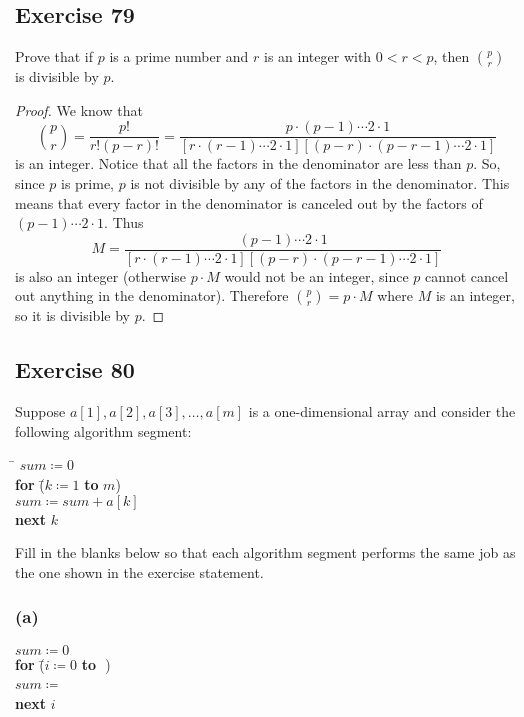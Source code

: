 \documentclass[14pt]{extarticle}
\newcommand{\dps}{\displaystyle}
\newcommand{\fbl}{\underline{\hspace{1cm}}\,\,}
\begin{document}
\subsection{Exercise 79}
Prove that if $p$ is a prime number and $r$ is an integer
with $0 < r < p$, then $\dps\binom{p}{r}$ is divisible by $p$.

\begin{proof}
    We know that
    \[
        \binom{p}{r} = \frac{p!}{r!(p-r)!} = \frac{p \cdot (p-1) \cdots 2 \cdot 1}{[r \cdot (r-1) \cdots 2 \cdot 1][(p-r) \cdot (p-r-1) \cdots 2 \cdot 1]}
    \]
    is an integer. Notice that all the factors in the denominator are less than $p$. So, since $p$ is prime, $p$ is not divisible by any of the factors in the denominator. This means that every factor in the denominator is canceled out by the factors of $(p-1) \cdots 2 \cdot 1$. Thus
    \[
        M = \frac{(p-1) \cdots 2 \cdot 1}{[r \cdot (r-1) \cdots 2 \cdot 1][(p-r) \cdot (p-r-1) \cdots 2 \cdot 1]}
    \]
    is also an integer (otherwise $p \cdot M$ would not be an integer, since $p$ cannot cancel out anything in the denominator). Therefore $\dps\binom{p}{r} = p\cdot M$ where $M$ is an integer, so it is divisible by $p$.
\end{proof}

\subsection{Exercise 80}
Suppose $a[1], a[2], a[3], \ldots, a[m]$ is a one-dimensional array and consider the following algorithm segment:

\begin{tabbing}
    \hspace{7cm}
    \= $sum \coloneqq 0$ \\
    \> {\bf for} \= ($k \coloneqq 1$ {\bf to} $m$) \\
    \>           \> $sum \coloneqq sum +  a[k]$ \\
    \> {\bf next} $k$
\end{tabbing}

Fill in the blanks below so that each algorithm segment performs the same job as the one shown in the exercise statement.

\subsubsection{(a)}
\begin{tabbing}
    $sum \coloneqq 0$ \\
    {\bf for} \= ($i \coloneqq 0$ {\bf to} \fbl) \\
    \> $sum \coloneqq$ \fbl \\
    {\bf next} $i$
\end{tabbing}
\end{document}
